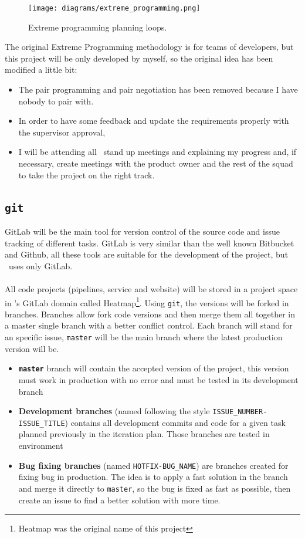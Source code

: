 \begin{figure}[H]
\centering
\texttt{[image: diagrams/extreme\_programming.png]}
\caption{Extreme programming planning loops.}
\end{figure}

The original Extreme Programming methodology is for teams of developers, but this project will be only developed by myself, so the original idea has been modified a little bit:

\begin{itemize}
    \item The pair programming and pair negotiation has been removed because I have nobody to pair with.
    \item In order to have some feedback and update the requirements properly with the supervisor approval,
    \item I will be attending all \squad\ stand up meetings and explaining my progress and, if necessary, create meetings with the product owner and the rest of the squad to take the project on the right track.
\end{itemize}


\subsection{\texttt{git}}

GitLab will be the main tool for version control of the source code and issue tracking of different tasks. GitLab\cite{gitlab} is very similar than the well known Bitbucket\cite{bitbucket} and Github\cite{github}, all these tools are suitable for the development of the project, but \company\ uses only GitLab.
\\\\
All code projects (pipelines, service and website) will be stored in a project space in \company's GitLab domain called Heatmap\footnote{Heatmap was the original name of this project}. Using \texttt{git}, the versions will be forked in branches. Branches allow fork code versions and then merge them all together in a master single branch with a better conflict control. Each branch will stand for an specific issue, \texttt{master} will be the main branch where the latest production version will be.

\begin{itemize}
    \item \textbf{\texttt{master}} branch will contain the accepted version of the project, this version must work in production with no error and must be tested in its development branch
    \item \textbf{Development branches} (named following the style \texttt{ISSUE\_NUMBER-ISSUE\_TITLE}) contains all development commits and code for a given task planned previously in the iteration plan. Those branches are tested in  environment 
    \item \textbf{Bug fixing branches} (named \texttt{HOTFIX-BUG\_NAME}) are branches created for fixing bug in production. The idea is to apply a fast solution in the branch and merge it directly to \texttt{master}, so the bug is fixed as fast as possible, then create an issue to find a better solution with more time.
\end{itemize}

